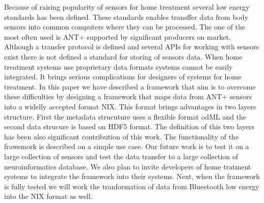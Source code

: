 \documentclass[conference]{IEEEconf}
\begin{document}
Because of raising popularity of sensors for home treatment several low energy standards has been defined. These standards enables transffer data from body sensors into common computers where they can be processed. The one of the most often used is ANT+ supported by significant producers on market. Although a transfer protocol is defined and several APIs for working with sensors exist there is not defined a standard for storing of sensors data. When home treatment systems use proprietary data formats systems cannot be easily integrated. It brings serious complications for designers of systems for home treatment. In this paper we have described a framework that aim is to overcome these difficulties by designing a framework that maps data from ANT+ sensors into a widelly accepted format NIX. This format brings advantages in two layers structure. First the metadata strucuture uses a flexible format odML and the second data strucure is based on HDF5 format. The definition of this two layers has been also significant contribution of this work. 
The functionality of the frawemork is described on a simple use case. Our future work is to test it on a large collection of sensors and test the data transfer to a large collection of neuroinformatics database. We also plan to invite developers of home tratment systems to integrate the framework into their systems. 
Next, when the framework is fully tested we will work the tranformation of data from Blueetooth low energy into the NIX format as well. 






\end{document}
